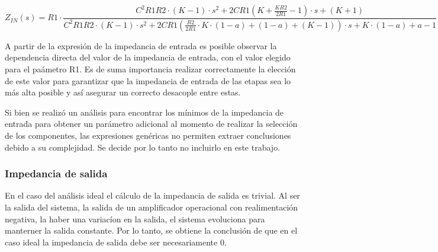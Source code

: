 \begin{equation}
    Z_{IN}(s) =R1\cdot \frac{ C^2 R1 R2\cdot (K-1) \cdot s^2 + 2 C R1\left( K+\frac{K R2}{2 R1} - 1\right) \cdot s + (K+1)  }{C^2 R1 R2\cdot (K-1) \cdot s^2+2 C R1\left( \frac{R2}{2 R1} \cdot K \cdot(1-a) +(1-a) + (K-1)\right) \cdot s + K\cdot (1-a)+ a -1}
    \label{eq:ZIN}
\end{equation}

A partir de la expresi\'on de la impedancia de entrada es posible observar la dependencia directa del valor de la impedancia de entrada, con el valor elegido para el pa\'ametro R1. Es de suma importancia realizar correctamente la elecci\'on de este valor para garantizar que la impedancia de entrada de las etapas sea lo m\'as alta posible y as\'i asegurar un correcto desacople entre estas.

Si bien se realiz\'o un an\'alisis para encontrar los m\'inimos de la impedancia de entrada para obtener un par\'ametro adicional al momento de realizar la selecci\'on de los componentes, las expresiones gen\'ericas no permiten extraer conclusiones debido a su complejidad. Se decide por lo tanto no incluirlo en este trabajo. 


\subsubsection{Impedancia de salida}
En el caso del an\'alisis ideal el c\'alculo de la impedancia de salida es trivial. Al ser la salida del sistema, la salida de un amplificador operacional con realimentaci\'on negativa, la haber una variac\'ion en la salida, el sistema evoluciona para manterner la salida constante. Por lo tanto, se obtiene la conclusi\'on de que en el caso ideal la impedancia de salida debe ser necesariamente 0.

